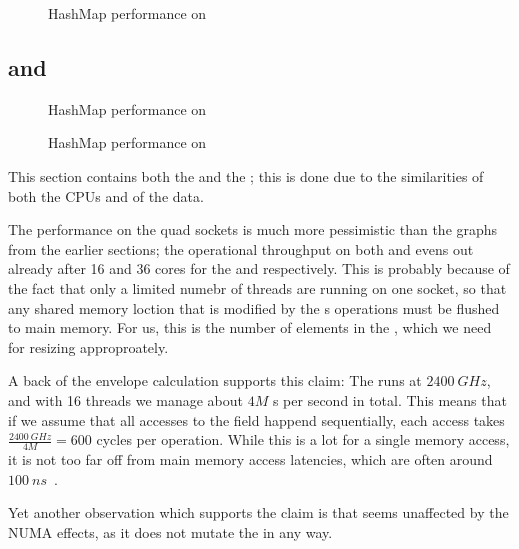 \begin{figure}[ht]
  \centering
  \caption{HashMap performance on \scaleway}
\end{figure}


\clearpage
\subsection{\mitserver{} and \daslab{}}

\begin{figure}[ht]
  \begin{minipage}[h]{\linewidth}
    \centering
    \caption{HashMap performance on \mitserver{}}
  \end{minipage}
  \begin{minipage}[h]{\linewidth}
    \centering
    \caption{HashMap performance on \daslab{}}
  \end{minipage}
\end{figure}

This section contains both the \mitserver{} and the \daslab{}; this is done due to the similarities
of both the CPUs and of the data.

The  performance on the quad sockets is much more pessimistic than the graphs from
the earlier sections; the operational throughput on both  and  evens out
already after 16 and 36 cores for the \mitserver{} and \daslab{} respectively. This is probably
because of the fact that only a limited numebr of threads are running on one socket, so that any
shared memory loction that is modified by the s operations must be flushed to main
memory. For us, this is the number of elements in the , which we need for resizing
approproately.

A back of the envelope calculation supports this claim: The \mitserver{} runs at $\SI{2400}{GHz}$,
and with 16 threads we manage about $4M$ s per second in total. This means that if we
assume that all accesses to the  field happend sequentially, each access takes
$\frac{\SI{2400}{GHz}}{4M} = 600$ cycles per operation. While this is a lot for a single memory
access, it is not too far off from main memory access latencies, which are often around
$\SI{100}{ns}$~\cite{memlatency}.

Yet another observation which supports the claim is that  seems unaffected by the
NUMA effects, as it does not mutate the  in any way.



